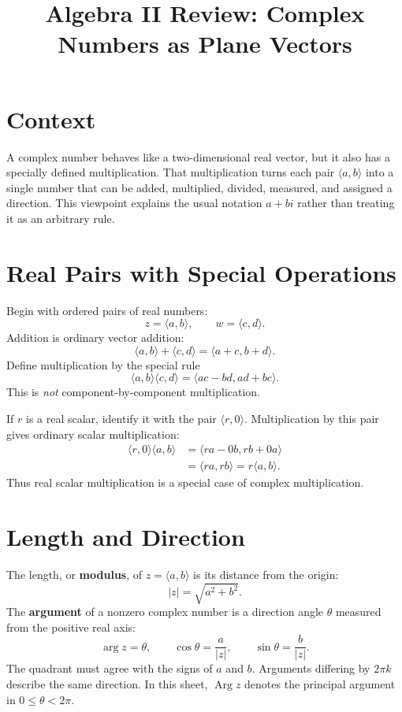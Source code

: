 \documentclass[12pt]{article}
\title{Algebra II Review: Complex Numbers as Plane Vectors}
\author{}
\date{}
\begin{document}
\maketitle

\section*{Context}
A complex number behaves like a two-dimensional real vector, but it also has a specially defined multiplication. That multiplication turns each pair $\langle a,b\rangle$ into a single number that can be added, multiplied, divided, measured, and assigned a direction. This viewpoint explains the usual notation $a+bi$ rather than treating it as an arbitrary rule.

\section*{Real Pairs with Special Operations}
Begin with ordered pairs of real numbers:
\[
  z=\langle a,b\rangle,
  \qquad
  w=\langle c,d\rangle.
\]
Addition is ordinary vector addition:
\[
  \langle a,b\rangle+\langle c,d\rangle
  =\langle a+c,b+d\rangle.
\]
Define multiplication by the special rule
\[
  \boxed{\langle a,b\rangle\langle c,d\rangle
  =\langle ac-bd,ad+bc\rangle.}
\]
This is \emph{not} component-by-component multiplication.

If $r$ is a real scalar, identify it with the pair $\langle r,0\rangle$. Multiplication by this pair gives ordinary scalar multiplication:
\[
\begin{aligned}
  \langle r,0\rangle\langle a,b\rangle
  &=\langle ra-0b,rb+0a\rangle\\
  &=\langle ra,rb\rangle
  =r\langle a,b\rangle.
\end{aligned}
\]
Thus real scalar multiplication is a special case of complex multiplication.

\section*{Length and Direction}
The length, or \textbf{modulus}, of $z=\langle a,b\rangle$ is its distance from the origin:
\[
  |z|=\sqrt{a^2+b^2}.
\]
The \textbf{argument} of a nonzero complex number is a direction angle $\theta$ measured from the positive real axis:
\[
  \arg z=\theta,
  \qquad
  \cos\theta=\frac{a}{|z|},
  \qquad
  \sin\theta=\frac{b}{|z|}.
\]
The quadrant must agree with the signs of $a$ and $b$. Arguments differing by $2\pi k$ describe the same direction. In this sheet, $\operatorname{Arg}z$ denotes the principal argument in $0\le\theta<2\pi$.
\end{document}
